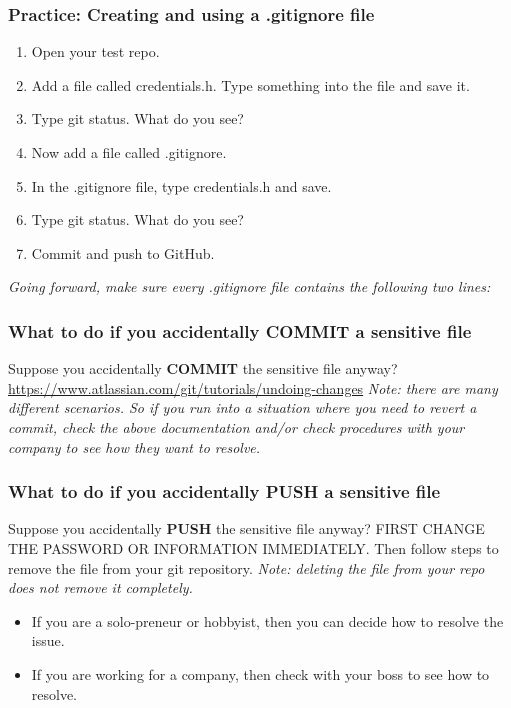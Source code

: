 \documentclass{beamer}
\begin{document}
\begin{frame}\frametitle{Practice: Creating and using a .gitignore file}
\begin{enumerate}
\item Open your test repo.
\item Add a file called credentials.h. Type something into the file and save it.
\item Type git status. What do you see?
\item Now add a file called .gitignore.
\item In the .gitignore file, type credentials.h and save.
\item Type git status. What do you see?
\item Commit and push to GitHub.
\end{enumerate}
\vspace{.5cm}
\emph{Going forward, make sure every .gitignore file contains the following two lines:}
\lstgitignore
\end{frame}

\begin{frame}\frametitle{What to do if you accidentally COMMIT a sensitive file}
Suppose you accidentally \textbf{COMMIT} the sensitive file anyway?\newline\newline
\url{https://www.atlassian.com/git/tutorials/undoing-changes}\newline\newline
\emph{Note: there are many different scenarios. So if you run into a situation where you need to revert a commit, check the above documentation and/or check procedures with your company to see how they want to resolve.}
\end{frame}

\begin{frame}\frametitle{What to do if you accidentally PUSH a sensitive file}
Suppose you accidentally \textbf{PUSH} the sensitive file anyway?\newline\newline
\color{red}
FIRST CHANGE THE PASSWORD OR INFORMATION IMMEDIATELY.\newline\newline
\color{black}Then follow steps to remove the file from your git repository.  \emph{Note: deleting the file from your repo does not remove it completely.}
\begin{itemize}
\item If you are a solo-preneur or hobbyist, then you can decide how to resolve the issue.
\item If you are working for a company, then check with your boss to see how to resolve.
\end{itemize}
\end{frame}
\end{document}
